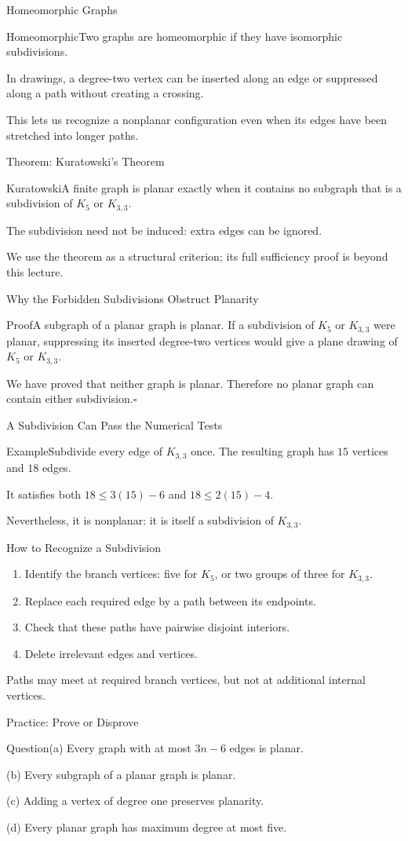 \documentclass[aspectratio=169,11pt]{beamer}
\newcommand{\Def}[2]{\begin{block}{#1}#2\end{block}}
\newcommand{\Thm}[2]{\begin{block}{#1}#2\end{block}}
\renewcommand{\Proof}[1]{\begin{block}{Proof}\normalsize #1\end{block}}
\newcommand{\Question}[1]{\begin{block}{Question}#1\end{block}}
\renewcommand{\Example}[1]{\begin{block}{Example}#1\end{block}}
\newcommand{\gap}{\par\medskip}
\begin{document}
\begin{frame}{Homeomorphic Graphs}
\large
\Def{Homeomorphic}{Two graphs are homeomorphic if they have isomorphic subdivisions.}
\gap In drawings, a degree-two vertex can be inserted along an edge or suppressed along a path without creating a crossing.
\gap This lets us recognize a nonplanar configuration even when its edges have been stretched into longer paths.
\end{frame}
\begin{frame}{Theorem: Kuratowski's Theorem}
\large
\Thm{Kuratowski}{A finite graph is planar exactly when it contains no subgraph that is a subdivision of $K_5$ or $K_{3,3}$.}
\gap The subdivision need not be induced: extra edges can be ignored.
\gap We use the theorem as a structural criterion; its full sufficiency proof is beyond this lecture.
\end{frame}
\begin{frame}{Why the Forbidden Subdivisions Obstruct Planarity}
\large
\Proof{A subgraph of a planar graph is planar. If a subdivision of $K_5$ or $K_{3,3}$ were planar, suppressing its inserted degree-two vertices would give a plane drawing of $K_5$ or $K_{3,3}$.\gap We have proved that neither graph is planar. Therefore no planar graph can contain either subdivision.\hfill$\square$}
\end{frame}
\begin{frame}{A Subdivision Can Pass the Numerical Tests}
\large
\Example{Subdivide every edge of $K_{3,3}$ once. The resulting graph has $15$ vertices and $18$ edges.}
It satisfies both $18\le3(15)-6$ and $18\le2(15)-4$.
\gap Nevertheless, it is nonplanar: it is itself a subdivision of $K_{3,3}$.
\end{frame}
\begin{frame}{How to Recognize a Subdivision}
\large
\begin{enumerate}\setlength{\itemsep}{.22cm}
\item Identify the branch vertices: five for $K_5$, or two groups of three for $K_{3,3}$.
\item Replace each required edge by a path between its endpoints.
\item Check that these paths have pairwise disjoint interiors.
\item Delete irrelevant edges and vertices.
\end{enumerate}
\gap Paths may meet at required branch vertices, but not at additional internal vertices.
\end{frame}
\begin{frame}{Practice: Prove or Disprove}
\large
\Question{(a) Every graph with at most $3n-6$ edges is planar.\gap (b) Every subgraph of a planar graph is planar.\gap (c) Adding a vertex of degree one preserves planarity.\gap (d) Every planar graph has maximum degree at most five.}
\end{frame}
\end{document}
